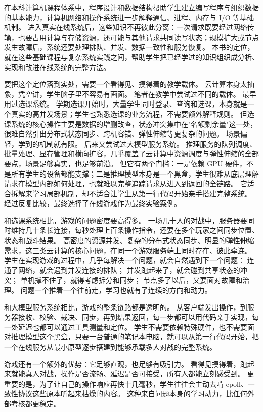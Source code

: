 在本科计算机课程体系中，程序设计和数据结构帮助学生建立编写程序与组织数据的基本能力，计算机网络和操作系统进一步解释通信、进程、内存与 I/O 等基础机制。
进入真实在线系统后，这些知识不再彼此分离：一次请求既要经过网络传输，也要占用计算与存储资源，还可能与其他请求共同读写状态；规模扩大或节点发生故障后，系统还要处理排队、并发、数据一致性和服务恢复。
本书的定位，就在这些基础课程与复杂系统实践之间，帮助学生把已经学过的知识组织成分析、实现和改进在线系统的完整方法。

要把这个定位落到实处，需要一个看得见、摸得着的教学载体。
云计算本身太抽象，凭空讲，学生脑子里不容易有画面。
笔者在教学中尝试过不同的载体。
最早用过选课系统。
学期选课开始时，大量学生同时登录、查询和选课，本身就是一个真实的高并发场景；学生也熟悉选课的业务流程，不需要额外解释规则。
但选课系统的核心操作主要是数据的增删改查，状态冲突集中在"名额剩余量"这一处，很难自然引出分布式状态同步、跨机容错、弹性伸缩等更复杂的问题。
场景偏轻，学到的机制就有限。
后来又尝试过大模型服务系统。
推理服务的队列调度、批量处理、显存管理和横向扩容，几乎覆盖了云计算中资源调度与弹性伸缩的全部要点，场景足够真实，也足够前沿。
但它有两个门槛：一是依赖 GPU 硬件，不是所有学生的设备都能支撑；二是推理模型本身是一个黑盒，学生很难从底层理解请求在模型内部如何处理，也就难以完整追踪请求从进入到返回的全链路。
它适合拆解来学习局部机制，却不适合让学生从第一行代码开始亲手搭建完整系统。
经过反复比较，最终选择了在线游戏作为最终实验案例。

和选课系统相比，游戏的问题密度要高得多。
一场几十人的对战中，服务器要同时维持几十条长连接，每秒处理上百条操作指令，还要在多个玩家之间同步位置、状态和战斗结果。
高密度的资源并发、复杂的分布式状态同步、明显的弹性伸缩需求，这三类云计算的核心问题，在同一个游戏服务端上同时存在、彼此牵连。
学生在实现游戏的过程中，几乎每解决一个问题，就会自然遇到下一个问题：
连通了网络，就会遇到并发连接的排队；
并发跑起来了，就会碰到共享状态的冲突；
单机撑不住了，就得考虑拆分和同步；
节点多了以后，又要面对故障和治理。
问题一个推着一个往前走，学习也就有了连续的方向和动力。

和大模型服务系统相比，游戏的整条链路都是透明的。
从客户端发出操作，到服务器接收、校验、裁决、同步，再到结果返回，每一步都可以用代码亲手实现，每一处延迟也都可以通过工具测量和定位。
学生不需要依赖特殊硬件，也不需要面对推理模型这个黑盒，只要一台普通的笔记本电脑，就可以从第一行代码开始，把一个在线服务从最小原型逐步搭建到能够承载多人对战的完整系统。

游戏还有一个额外的优势：它足够直观，也足够有吸引力。
看得见摸得着，跑起来就能真人对战，操作是否流畅、延迟是否可接受，所有人都能立刻感受到。
更重要的是，为了让自己的操作响应再快十几毫秒，学生往往会主动去啃 epoll、一致性协议这些原本听起来枯燥的内容。
这种来自问题本身的学习动力，比任何外部考核都更稳定。

